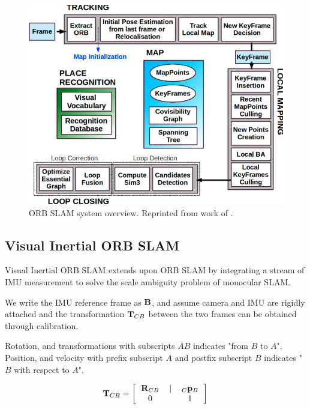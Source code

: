 \begin{figure}
	\centering
	\includegraphics[width=5in]{figures/orb_slam1}
	\caption[ORB SLAM architecture]{\small 
		ORB SLAM system overview. Reprinted from work of . }
	\label{fig:orb_slam1}
\end{figure}

\subsection{Visual Inertial ORB SLAM}

Visual Inertial ORB SLAM  extends upon ORB SLAM by integrating a stream of IMU measurement to solve the scale ambiguity problem of monocular SLAM.

We write the IMU reference frame as ${\bf B}$, and assume camera and IMU are rigidly attached and the transformation ${\bf T}_{CB}$ between the two frames can be obtained through calibration.

Rotation, and transformations with subscripts $AB$ indicates "from $B$ to $A$". Position, and velocity with prefix subscript $A$ and postfix subscript $B$ indicates "$B$ with respect to $A$".

\begin{equation}
{\bf T}_{CB} = \left [
\begin{tabular}{ccc}
${\bf R}_{CB}$ & $\vert$ & $_C{\bf p}_B$ \\
$0$ & & $1$ \\
\end{tabular}      
\right ] 
\end{equation}

